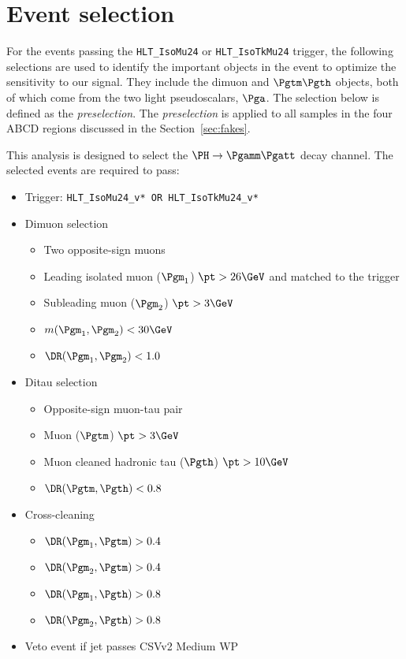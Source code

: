 \section{Event selection\label{sec:analysisregions}}

For the events passing the \texttt{HLT\_IsoMu24} or \texttt{HLT\_IsoTkMu24} trigger, 
the following selections are used to identify the important objects in the event
to optimize the sensitivity to our signal.
They include the dimuon and $\Pgtm\Pgth$ objects,
both of which come from the two light pseudoscalars, $\Pga$.
The selection below is defined as the \textit{preselection}.
The \textit{preselection} is applied to all samples in the four ABCD regions discussed in the Section~\ref{sec:fakes}. 

This analysis is designed to select the $\PH \rightarrow \Pgamm\Pgatt$ decay channel.
The selected events are required to pass:
\begin{itemize}
  \item Trigger: \verb|HLT_IsoMu24_v* OR HLT_IsoTkMu24_v*|
  \item Dimuon selection
  \begin{itemize}
    \item Two opposite-sign muons
    \item Leading isolated muon ($\Pgm_1$) $\pt > 26 \GeV$ and matched to the trigger
    \item Subleading muon ($\Pgm_2$) $\pt > 3 \GeV$
    \item $m(\Pgm_1, \Pgm_2) < 30 \GeV$
    \item $\DR(\Pgm_1, \Pgm_2) < 1.0$
  \end{itemize}
  \item Ditau selection
  \begin{itemize}
    \item Opposite-sign muon-tau pair
    \item Muon ($\Pgtm$) $\pt > 3 \GeV$
    \item Muon cleaned hadronic tau ($\Pgth$) $\pt > 10 \GeV$
    \item $\DR(\Pgtm, \Pgth) < 0.8$
  \end{itemize}
  \item Cross-cleaning
  \begin{itemize}
    \item $\DR(\Pgm_1, \Pgtm) > 0.4$
    \item $\DR(\Pgm_2, \Pgtm) > 0.4$
    \item $\DR(\Pgm_1, \Pgth) > 0.8$
    \item $\DR(\Pgm_2, \Pgth) > 0.8$
  \end{itemize}
  \item Veto event if \PGth jet passes CSVv2 Medium WP
\end{itemize}

